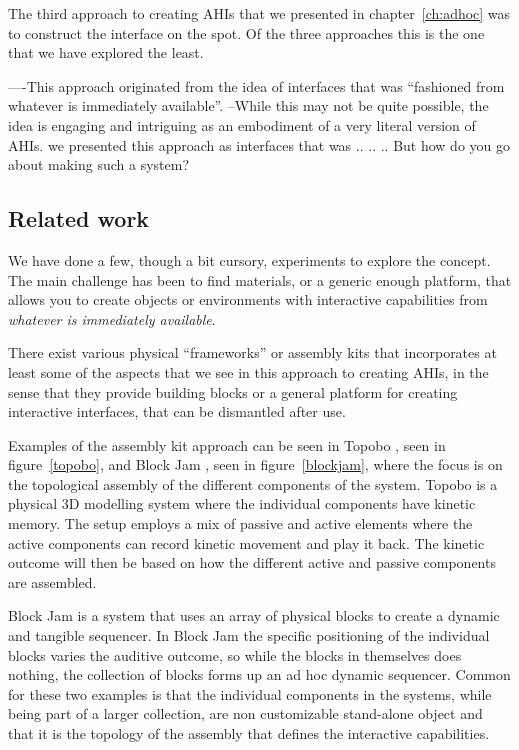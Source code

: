 The third approach to creating AHIs that we presented in chapter~\ref{ch:adhoc} was to construct the interface on the spot.
Of the three approaches this is the one that we have explored the least.

----This approach originated from the idea of interfaces that was ``fashioned from whatever is immediately available''.
--While this may not be quite possible, the idea is engaging and intriguing as an embodiment of a very literal version of AHIs. 
we presented this approach as interfaces that was .. .. .. 
But how do you go about making such a system?

\subsection{Related work}
We have done a few, though a bit cursory, experiments to explore the concept.
The main challenge has been to find materials, or a generic enough platform, that allows you to create objects or environments with interactive capabilities from \emph{whatever is immediately available}. 

There exist various physical ``frameworks'' or assembly kits that incorporates at least some of the aspects that we see in this approach to creating AHIs, in the sense that they provide building blocks or a general platform for creating interactive interfaces, that can be dismantled after use.

Examples of the assembly kit approach can be seen in Topobo \citep{raffle2004topobo}, seen in figure~\ref{topobo}, and Block Jam \citep{newton2003block}, seen in figure~\ref{blockjam}, where the focus is on the topological assembly of the different components of the system. 
Topobo is a physical 3D modelling system where the individual components have kinetic memory. 
The setup employs a mix of passive and active elements where the active components can record kinetic movement and play it back.
The kinetic outcome will then be based on how the different active and passive components are assembled.

Block Jam is a system that uses an array of physical blocks to create a dynamic and tangible sequencer.
In Block Jam the specific positioning of the individual blocks varies the auditive outcome, so while the blocks in themselves does nothing, the collection of blocks forms up an ad hoc dynamic sequencer.
Common for these two examples is that the individual components in the systems, while being part of a larger collection, are non customizable stand-alone object and that it is the topology of the assembly that defines the interactive capabilities.

